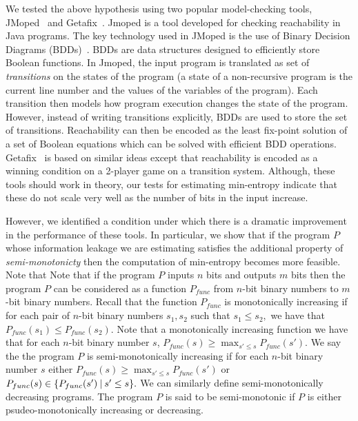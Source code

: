 We tested the above  hypothesis using two popular model-checking tools, JMoped~\cite{Jmoped} and Getafix~\cite{getafix}. 
Jmoped is a tool developed for checking reachability in Java programs. The key technology used in JMoped is the use of Binary Decision Diagrams (BDDs)~\cite{}. BDDs are data structures designed to efficiently   store Boolean functions. In Jmoped, the input program is translated  as set of \emph{transitions} on the states of the program (a state of a non-recursive program is the current line number and the values of the variables of the program). Each transition  then models how program execution changes the state of the program.  However, instead of writing transitions explicitly,
BDDs are used to store the set of transitions.  Reachability can then be encoded as  the least fix-point solution of a set of Boolean equations which can be solved with efficient BDD operations. Getafix~\cite{} is based on similar ideas except that reachability is encoded as a winning condition on a 2-player game on a  transition system. 
Although, these tools should work in theory, our tests for estimating min-entropy indicate that these do not scale very well  as the number of bits in the input increase. 


However, we  identified a condition under which there is a dramatic improvement in the performance of these tools. In particular, we show that if the program $P$ whose information leakage we are estimating satisfies the additional property of \emph{semi-monotonicty} then the computation of min-entropy becomes more feasible. Note that  
  Note that if the program $P$ inputs $n$ bits and outputs $m$ bits then the program $P$ can be considered as  a function $P_{func}$ from $n$-bit binary numbers to $m$-bit binary numbers. Recall that the function $P_{func}$ is monotonically increasing  if  for each pair of $n$-bit  binary numbers $s_1, s_2$  such that  $s_1\leq s_2,$ we have that $P_{func}(s_1) \leq P_{func}(s_2).$ Note that a monotonically increasing  function we have that for each $n$-bit binary number $s$, $P_{func}(s) \geq \max_{ s'\leq s} {P_{func}(s')}.$
    We say the the program $P$ is semi-monotonically increasing if for each $n$-bit  binary number $s$ either $P_{func}(s) \geq \max_{ s'\leq s}{P_{func}(s')}$ or $P_{func}(s) \in \{ P_{func}(s') \mathbin{|} s'\leq s \}.$ We can similarly define semi-monotonically decreasing programs. The program $P$ is said to be semi-monotonic if $P$ is either 
    psudeo-monotonically increasing or decreasing. 

